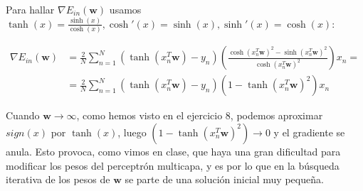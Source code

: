 \documentclass[11pt,leqno]{article}
\theoremstyle{definition}
\begin{document}
  \begin{solucion}
  Para hallar $\nabla E_{in}(\mathbf{w})$ usamos $\tanh(x) = \frac{\sinh(x)}{\cosh(x)}, \cosh'(x) = \sinh(x), \sinh'(x)=\cosh(x)$:
  
  \begin{align*}  
   \nabla E_{in}(\mathbf{w}) &= \frac{2}{N} \sum_{n=1}^N \left(  \tanh(x_n^T\mathbf{w}) - y_n \right)\left( \frac{\cosh(x_n^T \mathbf{w})^2- \sinh(x_n^T \mathbf{w})^2}{\cosh(x_n^T \mathbf{w})^2} \right)  x_n = \\
   &= \frac{2}{N} \sum_{n=1}^N \left(  \tanh(x_n^T\mathbf{w}) - y_n \right) \left( 1 - \tanh(x_n^T\mathbf{w})^2 \right) x_n
   \end{align*}   	
   
   Cuando $\mathbf{w} \rightarrow \infty$, como hemos visto en el ejercicio 8, podemos aproximar $sign(x)$ por $\tanh(x)$, luego $\left( 1 - \tanh(x_n^T\mathbf{w})^2 \right) \rightarrow 0$ y el gradiente se anula. Esto provoca, como vimos en clase, que haya una gran dificultad para modificar los pesos del perceptrón multicapa, y es por lo que en la búsqueda iterativa de los pesos de $\mathbf{w}$ se parte de una solución inicial muy pequeña.
  \end{solucion}
  
\end{document}
